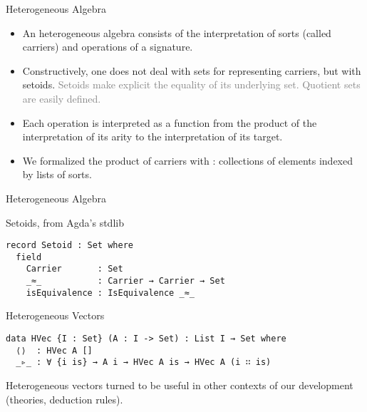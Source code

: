 \documentclass[11pt]{beamer}
\let\emph\relax
\newcommand{\point}[1]{\textcolor{gray}{#1}}
\begin{document}
\begin{frame}[fragile]{Heterogeneous Algebra}
  \begin{itemize}[<+->]
    \setlength\itemsep{1em}
  \item An heterogeneous algebra consists of the interpretation of sorts (called carriers) and operations of
    a signature.

  \item Constructively, one does not deal with sets for representing carriers, but with setoids.
    \point{Setoids make explicit the equality of its underlying set.
      Quotient sets are easily defined.}
    
  \item Each operation is interpreted as a function from
    the product of the interpretation of its arity to the
    interpretation of its target.
    
  \item We formalized the product of carriers with
    \emph{heterogeneous vectors}: collections of elements indexed by lists
    of sorts.
  \end{itemize}
\end{frame}

\begin{frame}[fragile]{Heterogeneous Algebra}
  \begin{block}{Setoids, from Agda's stdlib}
    \begin{verbatim}
record Setoid : Set where
  field
    Carrier       : Set 
    _≈_           : Carrier → Carrier → Set
    isEquivalence : IsEquivalence _≈_
      \end{verbatim}
  \end{block}
  \pause
  \begin{block}{Heterogeneous Vectors}
    \begin{verbatim}
data HVec {I : Set} (A : I -> Set) : List I → Set where
  ⟨⟩  : HVec A []
  _▹_ : ∀ {i is} → A i → HVec A is → HVec A (i ∷ is)
       \end{verbatim}
     \end{block}
     Heterogeneous vectors turned to be useful in other contexts of
     our development (theories, deduction rules).
\end{frame}
\end{document}
